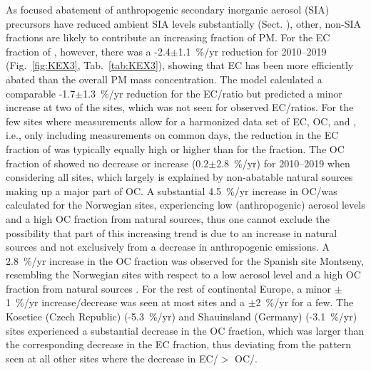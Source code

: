 As focused abatement of anthropogenic secondary inorganic aerosol (SIA)
precursors have reduced ambient SIA levels substantially (Sect. ),
other, non-SIA fractions are likely to contribute an increasing fraction
of PM. For the EC fraction of \pmfine, however, there was a -2.4$\pm$1.1~\%/yr
reduction for 2010--2019 (Fig.~\ref{fig:KEX3}, Tab.~\ref{tab:KEX3}), showing that EC has been
more efficiently abated than the overall PM mass concentration. The model
calculated a comparable -1.7$\pm$1.3~\%/yr reduction for the EC/\pmfine ratio
but predicted a minor increase at two of the sites, which was not seen for
observed EC/\pmfine ratios. For the few sites where measurements allow for
a harmonized data set of EC, OC,  and \pmfine, i.e., only including
measurements on common days, the reduction in the EC fraction of \pmfine
was typically equally high or higher than for the  fraction. The
OC fraction of \pmfine showed no decrease or increase (0.2$\pm$2.8~\%/yr)
for 2010--2019 when considering all sites, which largely is explained by
non-abatable natural sources making up a major part of OC. A substantial
4.5~\%/yr increase in OC/\pmfine was calculated for the Norwegian sites,
experiencing low (anthropogenic) aerosol levels and a high OC fraction
from natural sources, thus one cannot exclude the possibility that part
of this increasing trend is due to an increase in natural sources and
not exclusively from a decrease in anthropogenic emissions. A 2.8~\%/yr
increase in the OC fraction was observed for the Spanish site Montseny,
resembling the Norwegian sites with respect to a low aerosol level and
a high OC fraction from natural sources \citep{Kulmala2011,Crippa2014}. For the
rest of continental Europe, a minor $\pm$1~\%/yr increase/decrease
was seen at most sites and a $\pm$2~\%/yr for a few. The Kosetice
(Czech Republic) (-5.3~\%/yr) and Shauinsland (Germany) (-3.1~\%/yr) sites
experienced a substantial decrease in the OC fraction, which was larger
than the corresponding decrease in the EC fraction, thus deviating from
the pattern seen at all other sites where the decrease in EC/\pmfine $>$
OC/\pmfine.

